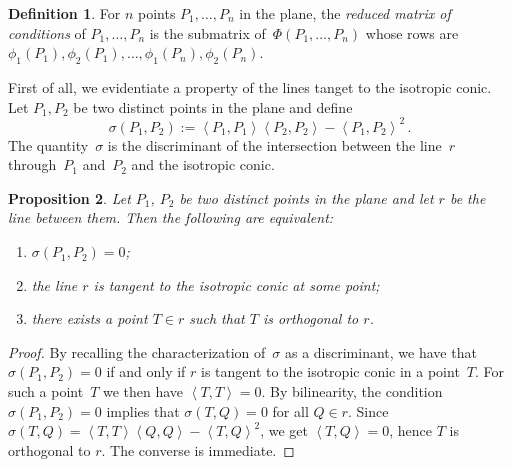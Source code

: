 \documentclass[12pt, a4paper, reqno, captions=tableheading,bibliography=totoc]{scrartcl}
\theoremstyle{plain}
\newtheorem{lemma}{Lemma}[section]
\newtheorem{prop}[lemma]{Proposition}
\theoremstyle{definition}
\newtheorem{definition}[lemma]{Definition}
\newcommand{\scl}[2]{\left\langle {#1}, {#2} \right\rangle}
\begin{document}
\begin{definition}
 \label{definition:reduced_matrix_conditions}
 For $n$ points $P_1, \dotsc, P_n$ in the plane, the \emph{reduced matrix of conditions} of $P_1, \dotsc, P_n$ is the submatrix of~$\Phi(P_1, \dotsc, P_n)$ whose rows are $\phi_1(P_1), \phi_2(P_1), \dotsc, \phi_1(P_n), \phi_2(P_n)$.
\end{definition}




First of all, we evidentiate a property of the lines tanget to the isotropic
conic. Let $P_1, P_2$ be two distinct points in the plane and define
%
\[
  \sigma(P_1, P_2) := \scl{P_1}{P_1} \scl{P_2}{P_2} - \scl{P_1}{P_2}^2 \,.
\]
%
The quantity~$\sigma$ is the discriminant of the intersection between the line~$r$ through~$P_1$ and~$P_2$ and the isotropic conic.


\begin{prop}
  Let $P_1$, $P_2$ be two distinct points in the plane and let $r$ be the line between them.
  Then the following are equivalent:
  \begin{enumerate}
  \item $\sigma(P_1, P_2) = 0$;
  \item the line $r$ is tangent to the isotropic conic at some point;
  \item there exists a point $T \in r$ such that $T$ is orthogonal to $r$.
  \end{enumerate}
\end{prop}
\begin{proof}
  By recalling the characterization of~$\sigma$ as a discriminant, we have that $\sigma(P_1, P_2) = 0$ if and only if $r$ is tangent to the isotropic conic in a point~$T$.
  For such a point~$T$ we then have $\scl{T}{T} = 0$.
  By bilinearity, the condition $\sigma(P_1, P_2) = 0$ implies that $\sigma(T, Q) = 0$ for all $Q \in r$.
  Since  $\sigma(T, Q) = \scl{T}{T}\scl{Q}{Q}-\scl{T}{Q}^2$, we get
  $\scl{T}{Q} = 0$, hence $T$ is orthogonal to $r$.
  The converse is immediate.
\end{proof}
\end{document}
